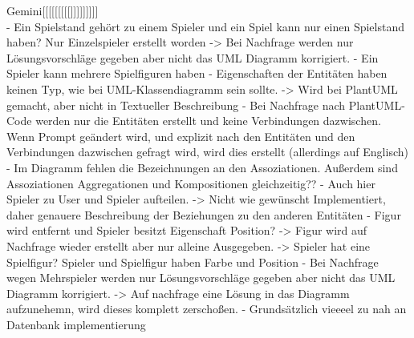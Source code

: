 Gemini[[[[[[[[[]]]]]]]]]\\
    - Ein Spielstand gehört zu einem Spieler und ein Spiel kann nur einen Spielstand haben? Nur Einzelspieler erstellt worden -> Bei Nachfrage 
    werden nur Lösungsvorschläge gegeben aber nicht das UML Diagramm korrigiert. 
    - Ein Spieler kann mehrere Spielfiguren haben
    - Eigenschaften der Entitäten haben keinen Typ, wie bei UML-Klassendiagramm sein sollte. -> Wird bei PlantUML gemacht, aber nicht in Textueller 
    Beschreibung
    - Bei Nachfrage nach PlantUML-Code werden nur die Entitäten erstellt und keine Verbindungen dazwischen. Wenn Prompt geändert wird, 
    und explizit nach den Entitäten und den Verbindungen dazwischen gefragt wird, wird dies erstellt (allerdings auf Englisch)
    - Im Diagramm fehlen die Bezeichnungen an den Assoziationen. Außerdem sind Assoziationen Aggregationen und Kompositionen gleichzeitig??
    - Auch hier Spieler zu User und Spieler aufteilen. -> Nicht wie gewünscht Implementiert, daher genauere Beschreibung der Beziehungen zu den 
    anderen Entitäten
    - Figur wird entfernt und Spieler besitzt Eigenschaft Position? -> Figur wird auf Nachfrage wieder erstellt aber nur alleine 
    Ausgegeben. -> Spieler hat eine Spielfigur? Spieler und Spielfigur haben Farbe und Position
    - Bei Nachfrage wegen Mehrspieler werden nur Lösungsvorschläge gegeben aber nicht das UML Diagramm korrigiert. -> Auf nachfrage eine Lösung 
    in das Diagramm aufzunehemn, wird dieses komplett zerschoßen. 
    - Grundsätzlich vieeeel zu nah an Datenbank implementierung


